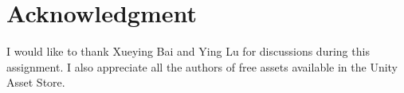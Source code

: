 \documentclass[11pt]{article}
\begin{document}
	
	\section{Acknowledgment}
	I would like to thank Xueying Bai and Ying Lu for discussions during this assignment. I also appreciate all the authors of free assets available in the Unity Asset Store.
	
	
\end{document}
